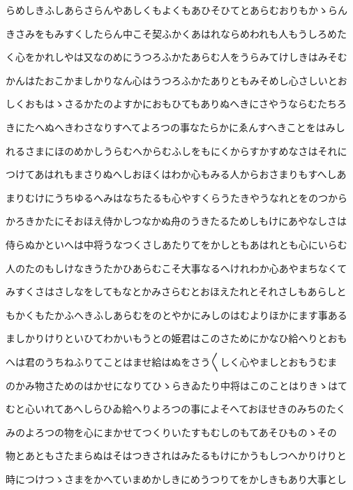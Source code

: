 \documentclass[a4paper,11pt,landscape]{ltjtarticle}
\begin{document}
\par\medskip
らめしきふしあらさらんやあしくもよくもあひそひてとあらむおりもかゝらん
\par\medskip
きさみをもみすくしたらん中こそ契ふかくあはれならめわれも人もうしろめた
\par\medskip
く心をかれしやは又なのめにうつろふかたあらむ人をうらみてけしきはみそむ
\par\medskip
かんはたおこかましかりなん心はうつろふかたありともみそめし心さしいとお
\par\medskip
しくおもはゝさるかたのよすかにおもひてもありぬへきにさやうならむたちろ
\par\medskip
きにたへぬへきわさなりすへてよろつの事なたらかにゑんすへきことをはみし
\par\medskip
れるさまにほのめかしうらむへからむふしをもにくからすかすめなさはそれに
\par\medskip
つけてあはれもまさりぬへしおほくはわか心もみる人からおさまりもすへしあ
\par\medskip
まりむけにうちゆるへみはなちたるも心やすくらうたきやうなれとをのつから
\par\medskip
かろきかたにそおほえ侍かしつなかぬ舟のうきたるためしもけにあやなしさは
\par\medskip
侍らぬかといへは中将うなつくさしあたりてをかしともあはれとも心にいらむ
\par\medskip
人のたのもしけなきうたかひあらむこそ大事なるへけれわか心あやまちなくて
\par\medskip
みすくさはさしなをしてもなとかみさらむとおほえたれとそれさしもあらしと
\par\medskip
もかくもたかふへきふしあらむをのとやかにみしのはむよりほかにます事ある
\par\medskip
ましかりけりといひてわかいもうとの姫君はこのさためにかなひ給へりとおも
\par\medskip
へは君のうちねふりてことはませ給はぬをさう〱しく心やましとおもうむま
\par\medskip
のかみ物さためのはかせになりてひゝらきゐたり中将はこのことはりきゝはて
\par\medskip
むと心いれてあへしらひゐ給へりよろつの事によそへておほせきのみちのたく
\par\medskip
みのよろつの物を心にまかせてつくりいたすもむしのもてあそひものゝその
\par\medskip
物とあともさたまらぬはそはつきされはみたるもけにかうもしつへかりけりと
\par\medskip
時につけつゝさまをかへていまめかしきにめうつりてをかしきもあり大事とし
\end{document}
